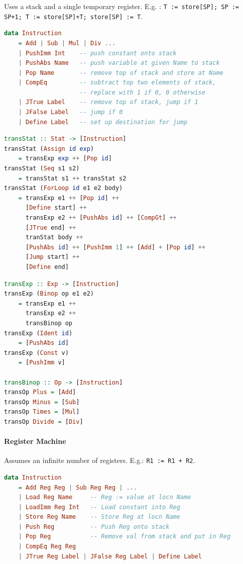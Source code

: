 \documentclass[twocolumn,english]{article}
\let\emph\relax
\begin{document}
Uses a stack and a single temporary register. E.g. \texttt{\emph{Add}}:
\texttt{T := store{[}SP{]}; SP := SP+1; T := store{[}SP{]}+T; store{[}SP{]}
:= T}. 
\begin{lstlisting}[language=Haskell,tabsize=2]
data Instruction
	= Add | Sub | Mul | Div ...
	| PushImm Int    -- push constant onto stack
	| PushAbs Name   -- push variable at given Name to stack
	| Pop Name       -- remove top of stack and store at Name
	| CompEq         -- subtract top two elements of stack,
	                 -- replace with 1 if 0, 0 otherwise
	| JTrue Label    -- remove top of stack, jump if 1
	| JFalse Label   -- jump if 0
	| Define Label   -- set up destination for jump
\end{lstlisting}

\begin{lstlisting}[language=Haskell,tabsize=2]
transStat :: Stat -> [Instruction]
transStat (Assign id exp)
	= transExp exp ++ [Pop id]
transStat (Seq s1 s2)
	= transStat s1 ++ transStat s2
transStat (ForLoop id e1 e2 body)
	= transExp e1 ++ [Pop id] ++
	  [Define start] ++
	  transExp e2 ++ [PushAbs id] ++ [CompGt] ++
	  [JTrue end] ++
	  tranStat body ++
	  [PushAbs id] ++ [PushImm 1] ++ [Add] + [Pop id] ++
	  [Jump start] ++
	  [Define end]
\end{lstlisting}

\begin{lstlisting}[language=Haskell,tabsize=2]
transExp :: Exp -> [Instruction]
transExp (Binop op e1 e2)
	= transExp e1 ++
	  transExp e2 ++
	  transBinop op
transExp (Ident id)
	= [PushAbs id]
transExp (Const v)
	= [PushImm v]

transBinop :: Op -> [Instruction]
transOp Plus = [Add]
transOp Minus = [Sub]
transOp Times = [Mul]
transOp Divide = [Div]
\end{lstlisting}

\paragraph{Register Machine}

Assumes an infinite number of registers. E.g.\texttt{\emph{ Add R1
R2}}: \texttt{R1 := R1 + R2}.
\begin{lstlisting}[language=Haskell,tabsize=2]
data Instruction
	= Add Reg Reg | Sub Reg Reg | ...
	| Load Reg Name     -- Reg := value at locn Name
	| LoadImm Reg Int   -- Load constant into Reg
	| Store Reg Name    -- Store Reg at locn Name
	| Push Reg          -- Push Reg onto stack
	| Pop Reg           -- Remove val from stack and put in Reg
	| CompEq Reg Reg
    | JTrue Reg Label | JFalse Reg Label | Define Label
\end{lstlisting}
\end{document}
